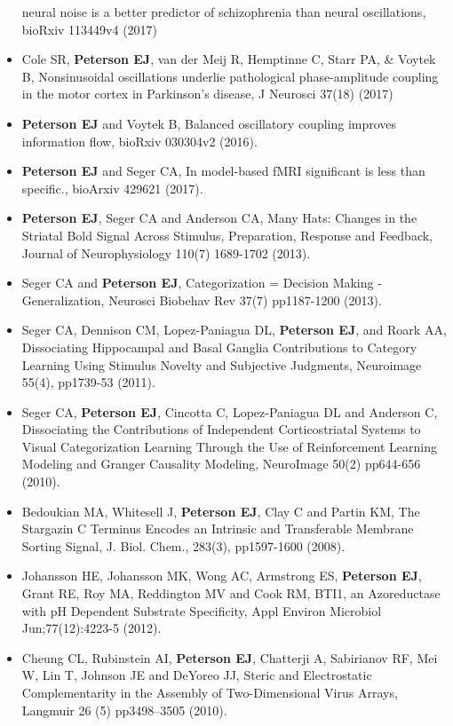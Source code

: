 \begin{itemize}
  neural noise is a better predictor of schizophrenia than neural
  oscillations, bioRxiv 113449v4 (2017)
\item
  Cole SR, \textbf{Peterson EJ}, van der Meij R, Hemptinne C, Starr PA,
  \& Voytek B, Nonsinusoidal oscillations underlie pathological
  phase-amplitude coupling in the motor cortex in Parkinson's disease, J
  Neurosci 37(18) (2017)
\item
  \textbf{Peterson EJ} and Voytek B, Balanced oscillatory coupling
  improves information flow, bioRxiv 030304v2 (2016).
\item
  \textbf{Peterson EJ} and Seger CA, In model-based fMRI significant is
  less than specific., bioArxiv 429621 (2017).
\item
  \textbf{Peterson EJ}, Seger CA and Anderson CA, Many Hats: Changes in
  the Striatal Bold Signal Across Stimulus, Preparation, Response and
  Feedback, Journal of Neurophysiology 110(7) 1689-1702 (2013).
\item
  Seger CA and \textbf{Peterson EJ}, Categorization = Decision Making -
  Generalization, Neurosci Biobehav Rev 37(7) pp1187-1200 (2013).
\item
  Seger CA, Dennison CM, Lopez-Paniagua DL, \textbf{Peterson EJ}, and
  Roark AA, Dissociating Hippocampal and Basal Ganglia Contributions to
  Category Learning Using Stimulus Novelty and Subjective Judgments,
  Neuroimage 55(4), pp1739-53 (2011).
\item
  Seger CA, \textbf{Peterson EJ}, Cincotta C, Lopez-Paniagua DL and
  Anderson C, Dissociating the Contributions of Independent
  Corticostriatal Systems to Visual Categorization Learning Through the
  Use of Reinforcement Learning Modeling and Granger Causality Modeling,
  NeuroImage 50(2) pp644-656 (2010).
\item
  Bedoukian MA, Whitesell J, \textbf{Peterson EJ}, Clay C and Partin KM,
  The Stargazin C Terminus Encodes an Intrinsic and Transferable
  Membrane Sorting Signal, J. Biol. Chem., 283(3), pp1597-1600 (2008).
\item
  Johansson HE, Johansson MK, Wong AC, Armstrong ES, \textbf{Peterson
  EJ}, Grant RE, Roy MA, Reddington MV and Cook RM, BTI1, an
  Azoreductase with pH Dependent Substrate Specificity, Appl Environ
  Microbiol Jun;77(12):4223-5 (2012).
\item
  Cheung CL, Rubinstein AI, \textbf{Peterson EJ}, Chatterji A,
  Sabirianov RF, Mei W, Lin T, Johnson JE and DeYoreo JJ, Steric and
  Electrostatic Complementarity in the Assembly of Two-Dimensional Virus
  Arrays, Langmuir 26 (5) pp3498--3505 (2010).
\end{itemize}

